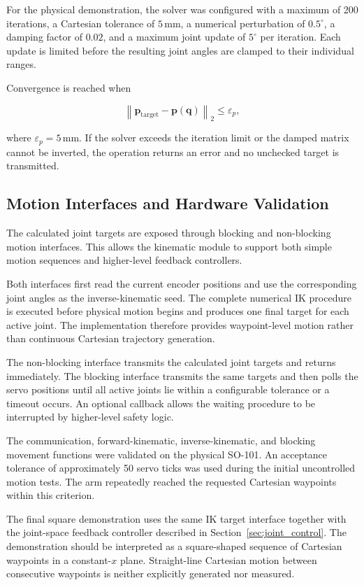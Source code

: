 For the physical demonstration, the solver was configured with a maximum of 200 iterations, a Cartesian tolerance of \(5\,\mathrm{mm}\), a numerical perturbation of \(0.5^{\circ}\), a damping factor of \(0.02\), and a maximum joint update of \(5^{\circ}\) per iteration. Each update is limited before the resulting joint angles are clamped to their individual ranges.

Convergence is reached when

\begin{equation}
    \left\|
        \mathbf{p}_{\mathrm{target}}
        -
        \mathbf{p}(\mathbf{q})
    \right\|_{2}
    \leq
    \varepsilon_{p},
    \label{eq:ik_convergence}
\end{equation}

where \(\varepsilon_{p}=5\,\mathrm{mm}\). If the solver exceeds the iteration limit or the damped matrix cannot be inverted, the operation returns an error and no unchecked target is transmitted.

\subsection{Motion Interfaces and Hardware Validation}

The calculated joint targets are exposed through blocking and non-blocking motion interfaces. This allows the kinematic module to support both simple motion sequences and higher-level feedback controllers.

Both interfaces first read the current encoder positions and use the corresponding joint angles as the inverse-kinematic seed. The complete numerical IK procedure is executed before physical motion begins and produces one final target for each active joint. The implementation therefore provides waypoint-level motion rather than continuous Cartesian trajectory generation.

The non-blocking interface transmits the calculated joint targets and returns immediately. The blocking interface transmits the same targets and then polls the servo positions until all active joints lie within a configurable tolerance or a timeout occurs. An optional callback allows the waiting procedure to be interrupted by higher-level safety logic.

The communication, forward-kinematic, inverse-kinematic, and blocking movement functions were validated on the physical SO-101. An acceptance tolerance of approximately 50 servo ticks was used during the initial uncontrolled motion tests. The arm repeatedly reached the requested Cartesian waypoints within this criterion.

The final square demonstration uses the same IK target interface together with the joint-space feedback controller described in Section~\ref{sec:joint_control}. The demonstration should be interpreted as a square-shaped sequence of Cartesian waypoints in a constant-\(x\) plane. Straight-line Cartesian motion between consecutive waypoints is neither explicitly generated nor measured.
